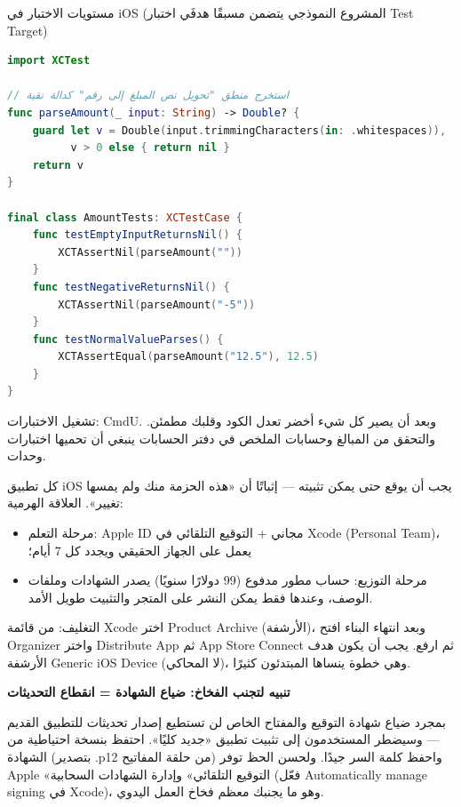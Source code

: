 \begin{center}\small\color{gray}مستويات الاختبار في iOS (المشروع النموذجي يتضمن مسبقًا هدفَي اختبار Test Target)\end{center}

\begin{lstlisting}[language=Swift]
import XCTest

// استخرج منطق "تحويل نص المبلغ إلى رقم" كدالة نقية
func parseAmount(_ input: String) -> Double? {
    guard let v = Double(input.trimmingCharacters(in: .whitespaces)),
          v > 0 else { return nil }
    return v
}

final class AmountTests: XCTestCase {
    func testEmptyInputReturnsNil() {
        XCTAssertNil(parseAmount(""))
    }
    func testNegativeReturnsNil() {
        XCTAssertNil(parseAmount("-5"))
    }
    func testNormalValueParses() {
        XCTAssertEqual(parseAmount("12.5"), 12.5)
    }
}
\end{lstlisting}

تشغيل الاختبارات: CmdU. وبعد أن يصير كل شيء أخضر تعدل الكود وقلبك مطمئن. والتحقق من المبالغ وحسابات الملخص في دفتر الحسابات ينبغي أن تحميها اختبارات وحدات.


كل تطبيق iOS يجب أن يوقع حتى يمكن تثبيته — إثباتًا أن «هذه الحزمة منك ولم يمسها تغيير». العلاقة الهرمية:

\begin{itemize}
  \item مرحلة التعلم: Apple ID مجاني + التوقيع التلقائي في Xcode (Personal Team)، يعمل على الجهاز الحقيقي ويجدد كل 7 أيام؛
  \item مرحلة التوزيع: حساب مطور مدفوع (99 دولارًا سنويًا) يصدر الشهادات وملفات الوصف، وعندها فقط يمكن النشر على المتجر والتثبيت طويل الأمد.
\end{itemize}

التغليف: من قائمة Xcode اختر Product Archive (الأرشفة)، وبعد انتهاء البناء افتح Organizer واختر Distribute App ثم App Store Connect ثم ارفع. يجب أن يكون هدف الأرشفة Generic iOS Device (لا المحاكي)، وهي خطوة ينساها المبتدئون كثيرًا.

\textbf{تنبيه لتجنب الفخاخ: ضياع الشهادة = انقطاع التحديثات}\par

بمجرد ضياع شهادة التوقيع والمفتاح الخاص لن تستطيع إصدار تحديثات للتطبيق القديم — وسيضطر المستخدمون إلى تثبيت تطبيق «جديد كليًا». احتفظ بنسخة احتياطية من الشهادة (بتصدير .p12 من حلقة المفاتيح) واحفظ كلمة السر جيدًا. ولحسن الحظ توفر Apple «التوقيع التلقائي» وإدارة الشهادات السحابية (فعّل Automatically manage signing في Xcode)، وهو ما يجنبك معظم فخاخ العمل اليدوي.

